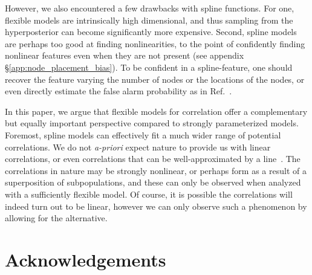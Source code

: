 \documentclass[%
 reprint,
 amsmath,amssymb,
 aps,
 prd,
]{revtex4-2}
\newcommand{\rednote}[1]{{\color{Red} #1}}
\begin{document}
However, we also encountered a few drawbacks with spline functions. For one, flexible models are intrinsically high dimensional, and thus sampling from the hyperposterior can become significantly more expensive. Second, spline models are perhaps too good at finding nonlinearities, to the point of confidently finding nonlinear features even when they are not present (see appendix \S \ref{app:node_placement_bias}). To be confident in a spline-feature, one should recover the feature varying the number of nodes or the locations of the nodes, or even directly estimate the false alarm probability as in Ref.~\cite{Farah:2023vsc}.

In this paper, we argue that flexible models for correlation offer a complementary but equally important perspective compared to strongly parameterized models. Foremost, spline models can effectively fit a much wider range of potential correlations. We do not \textit{a-priori} expect nature to provide us with linear correlations, or even correlations that can be well-approximated by a line~\cite[e.g.,][]{Belczynski:2017gds, PortegiesZwart:2002iks, Rodriguez:2015oxa, Gerosa:2021mno}.  The correlations in nature may be strongly nonlinear, or perhaps form as a result of a superposition of subpopulations, and these can only be observed when analyzed with a sufficiently flexible model. Of course, it is possible the correlations will indeed turn out to be linear, however we can only observe such a phenomenon by allowing for the alternative.







\section{Acknowledgements}
\end{document}
